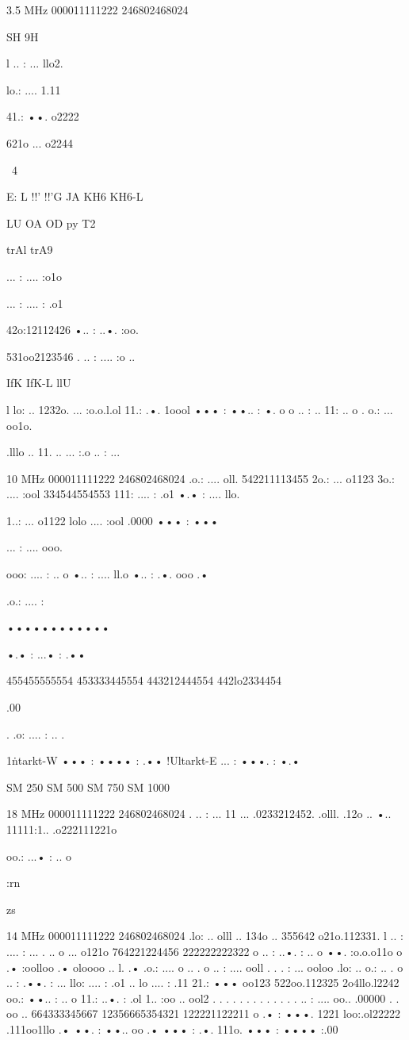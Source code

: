 3.5 MHz
000011111222
246802468024

SH
9H

l .. : ... llo2.

lo.: .... 1.11

41.: ••. o2222

621o ... o2244

~4

E: L
!!'
!!'G
JA
KH6
KH6-L

LU
OA
OD
py
T2

trAl
trA9

... : .... :o1o

... : .... : .o1

42o:12112426
•.. : ..•. :oo.

531oo2123546
. .. : .... :o ..

IfK
IfK-L
llU

l lo: .. 1232o.
... :o.o.l.ol
11.: .•. 1oool
••• : ••.. : •. o
o .. : .. 11: .. o
. o.: ... oo1o.

.lllo .. 11. ..
... :.o .. : ...

10 MHz
000011111222
246802468024
.o.: .... oll.
542211113455
2o.: ... o1123
3o.: .... :ool
334544554553
111: .... : .o1
•.• : .... llo.

1..: ... o1122
lolo .... :ool
.0000 ••• : •••

... : .... ooo.

ooo: .... : .. o
•.. : .... ll.o
•.. : .•. ooo .•

.o.: .... :

••••••••••••

•.• : ...• : .••

455455555554
453333445554
443212444554
442lo2334454

.00

. .o: .... : .. .

1\.ntarkt-W ••• : •••• : .••
!Ultarkt-E ... : •••. : •.•

SM 250
SM 500
SM 750
SM 1000

18 MHz
000011111222
246802468024
. .. : ... 11 ...
.0233212452.
.olll. .12o ..
•.. 11111:1..
.o222111221o

oo.: ...• : .. o

:rn

zs

14 MHz
000011111222
246802468024
.lo: .. olll ..
134o .. 355642
o21o.112331.
l .. : .... : ...
. .. o ... o121o
764221224456
222222222322
o .. : ..•. : .. o
••. :o.o.o11o
o .• :oolloo .•
oloooo .. l. .•
.o.: .... o .. .
o .. : .... ooll . . . : ... ooloo .lo: .. o.: .. .
o .. : .••. : ... llo: .... : .o1 .. lo .... : .11
21.: ••• oo123 522oo.112325 2o4llo.l2242
oo.: ••.. : .. o 11.: ..•. : .ol 1.. :oo .. ool2
. . . . . . . . . . . . . .. : .... oo.. .00000 . . oo ..
664333345667 12356665354321 122221122211
o .• : •••. 1221 loo:.ol22222 .111oo1llo .•
••. : ••.. oo .• ••• : .•. 111o.
••• : •••• :.00

